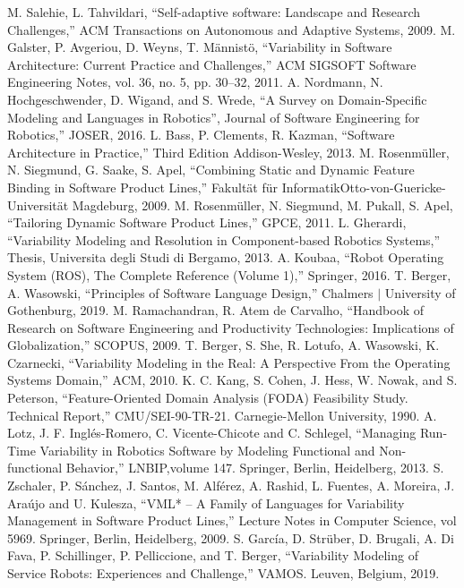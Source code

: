 \documentclass[conference]{IEEEtran}
\begin{document}
\begin{thebibliography}{00}
 M. Salehie, L. Tahvildari, ``Self-adaptive software: Landscape and Research Challenges,'' ACM Transactions on Autonomous and Adaptive Systems, 2009.
 M. Galster, P. Avgeriou, D. Weyns, T. Männistö, ``Variability in Software Architecture: Current Practice and Challenges,'' ACM SIGSOFT Software Engineering Notes, vol. 36, no. 5, pp. 30–32, 2011.
 A. Nordmann, N. Hochgeschwender, D. Wigand, and S. Wrede, ``A Survey on Domain-Specific Modeling and Languages in Robotics”, Journal of Software Engineering for Robotics,'' JOSER, 2016.
 L. Bass, P. Clements, R. Kazman, ``Software Architecture in Practice,'' Third Edition Addison-Wesley, 2013.
 M. Rosenmüller, N. Siegmund, G. Saake, S. Apel, ``Combining Static and Dynamic Feature Binding in
Software Product Lines,'' Fakultät für InformatikOtto-von-Guericke-Universität Magdeburg, 2009.
 M. Rosenmüller, N. Siegmund, M. Pukall, S. Apel, ``Tailoring Dynamic Software Product Lines,'' GPCE, 2011.
 L. Gherardi, ``Variability Modeling and Resolution in Component-based Robotics Systems,'' Thesis,  Universita degli Studi di Bergamo, 2013.
 A. Koubaa, ``Robot Operating System (ROS), The Complete Reference (Volume 1),'' Springer, 2016.
 T. Berger, A. Wasowski, ``Principles of Software Language Design,'' Chalmers $|$ University of Gothenburg, 2019.
 M. Ramachandran, R. Atem de Carvalho, ``Handbook of Research on Software Engineering and Productivity Technologies: Implications of Globalization,'' SCOPUS, 2009.
 T. Berger, S. She, R. Lotufo, A. Wasowski, K. Czarnecki, ``Variability Modeling in the Real: A Perspective From the Operating Systems Domain,'' ACM, 2010.
 K. C. Kang, S. Cohen, J. Hess, W. Nowak, and S. Peterson, ``Feature-Oriented Domain Analysis (FODA) Feasibility Study. Technical
Report,'' CMU/SEI-90-TR-21. Carnegie-Mellon University, 1990.
 A. Lotz, J. F. Ingl\'{e}s-Romero, C. Vicente-Chicote and C. Schlegel, ``Managing Run-Time Variability in Robotics Software by Modeling Functional and Non-functional Behavior,'' LNBIP,volume 147. Springer, Berlin, Heidelberg, 2013.
 S. Zschaler, P. S\'{a}nchez, J. Santos, M. Alf\'{e}rez, A. Rashid, L. Fuentes, A. Moreira, J. Ara\'{u}jo and U. Kulesza, ``VML* – A Family of Languages for Variability
Management in Software Product Lines,'' Lecture Notes in Computer Science, vol 5969. Springer, Berlin, Heidelberg, 2009.
 S. Garc\'{i}a, D. Strüber,  D. Brugali, A. Di Fava, P. Schillinger, P. Pelliccione, and T. Berger, ``Variability Modeling of Service Robots: Experiences and Challenge,'' VAMOS. Leuven, Belgium, 2019.
\end{thebibliography}
\vspace{12pt}
\end{document}
